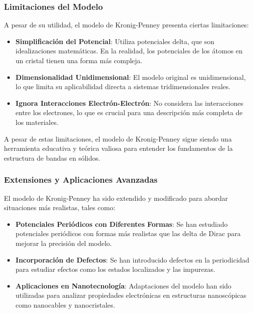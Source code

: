 \documentclass[a4paper,12pt]{article}
\begin{document}
\subsubsection{Limitaciones del Modelo}

A pesar de su utilidad, el modelo de Kronig-Penney presenta ciertas limitaciones:

\begin{itemize}
    \item \textbf{Simplificación del Potencial}: Utiliza potenciales delta, que son idealizaciones matemáticas. En la realidad, los potenciales de los átomos en un cristal tienen una forma más compleja.
    
    \item \textbf{Dimensionalidad Unidimensional}: El modelo original es unidimensional, lo que limita su aplicabilidad directa a sistemas tridimensionales reales.
    
    \item \textbf{Ignora Interacciones Electrón-Electrón}: No considera las interacciones entre los electrones, lo que es crucial para una descripción más completa de los materiales.
\end{itemize}

A pesar de estas limitaciones, el modelo de Kronig-Penney sigue siendo una herramienta educativa y teórica valiosa para entender los fundamentos de la estructura de bandas en sólidos.

\subsubsection{Extensiones y Aplicaciones Avanzadas}

El modelo de Kronig-Penney ha sido extendido y modificado para abordar situaciones más realistas, tales como:

\begin{itemize}
    \item \textbf{Potenciales Periódicos con Diferentes Formas}: Se han estudiado potenciales periódicos con formas más realistas que las delta de Dirac para mejorar la precisión del modelo.
    
    \item \textbf{Incorporación de Defectos}: Se han introducido defectos en la periodicidad para estudiar efectos como los estados localizados y las impurezas.
    
    \item \textbf{Aplicaciones en Nanotecnología}: Adaptaciones del modelo han sido utilizadas para analizar propiedades electrónicas en estructuras nanoscópicas como nanocables y nanocristales.
\end{itemize}
\end{document}
